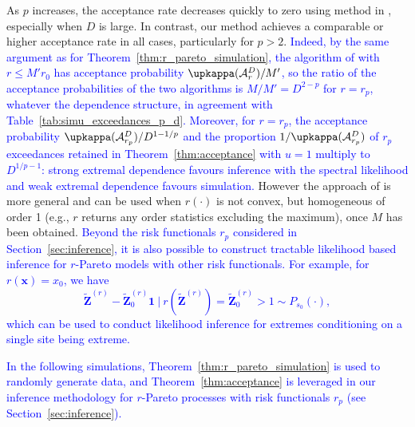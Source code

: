 \documentclass[12pt]{article}
\newcommand{\PZ}{\textcolor{blue}}
\begin{document}
%
As $p$ increases, the acceptance rate decreases quickly to zero using method in \citet{Dombry.etal:2024}, especially when $D$ is large. In contrast, our method achieves a comparable or higher acceptance rate
in all cases, particularly for $p>2$. \PZ{Indeed, by the same argument as for Theorem~\ref{thm:r_pareto_simulation}, the algorithm of \citet[Proposition 2]{Dombry.etal:2024} with $r\leq M'r_0$ has acceptance probability $\upkappa(\calA^D_r)/M'$, so the ratio of the acceptance probabilities of the two algorithms is $M/M'=D^{2-p}$ for $r=r_p$, whatever the dependence structure, in agreement with Table~\ref{tab:simu_exceedances_p_d}. Moreover, for $r=r_p$, the acceptance probability $\upkappa(\calA^D_{r_p})/D^{1-1/p}$ and the proportion $1/\upkappa(\calA^D_{r_p})$ of $r_p$ exceedances retained in Theorem~\ref{thm:acceptance} with $u=1$ multiply to $D^{1/p-1}$: strong extremal dependence favours inference with the spectral likelihood and weak extremal dependence favours simulation.}
%
However the approach of \citet{Dombry.etal:2024} is more general and can be used when $r(\cdot)$ is not convex, but homogeneous of order 1 (e.g., $r$ returns any order statistics excluding the maximum), once $M$ has been obtained. %
\PZ{Beyond the risk functionals $r_p$ considered in Section~\ref{sec:inference}, it is also possible to construct tractable likelihood based inference for $r$-Pareto models with other risk functionals.} \PZ{For example, for $r(\bm x) = x_0$, we have 
$$\bm{\tilde Z}^{(r)} - \bm{\tilde Z}^{(r)}_0 \bm 1\ |\ r(\bm{\tilde Z}^{(r)}) = \bm{\tilde Z}^{(r)}_0 > 1 \sim P_{s_0}(\cdot),$$ 
which can be used to conduct likelihood inference for extremes conditioning on a single site being extreme.}

\PZ{In the following simulations, Theorem~\ref{thm:r_pareto_simulation} is used to randomly generate data, and Theorem~\ref{thm:acceptance} is leveraged in our inference methodology for $r$-Pareto processes with risk functionals $r_p$ (see Section~\ref{sec:inference}).}
\end{document}
